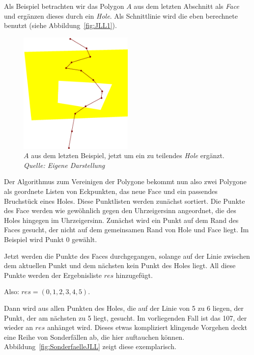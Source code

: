 Als Beispiel betrachten wir das Polygon $A$ aus dem letzten Abschnitt als \textit{Face} und ergänzen dieses durch ein \textit{Hole}. Als Schnittlinie wird die eben berechnete benutzt (siehe Abbildung~\vref{fig:JLL1}).

\begin{figure}
	\centering
	\includegraphics[width=0.5\textwidth]{JLL1.svg.eps}
	\caption[Face mit einem Hole wird geteilt]{$A$ aus dem letzten Beispiel, jetzt um ein zu teilendes \textit{Hole} ergänzt.\\\textit{Quelle: Eigene Darstellung}}
	\label{fig:JLL1}
\end{figure}

Der Algorithmus zum Vereinigen der Polygone bekommt nun also zwei Polygone als geordnete Listen von Eckpunkten, das neue Face und ein passendes Bruchstück eines Holes. Diese Punktlisten werden zunächst sortiert. Die Punkte des Face werden wie gewöhnlich gegen den Uhrzeigersinn  angeordnet, die des Holes hingegen im Uhrzeigersinn. Zunächst wird  ein Punkt auf dem Rand des Faces gesucht, der nicht auf dem gemeinsamen Rand von Hole und Face liegt. Im Beispiel wird Punkt 0 gewählt.

Jetzt werden die Punkte des Faces durchgegangen, solange auf der Linie zwischen dem aktuellen Punkt und dem nächsten kein Punkt des Holes liegt. All diese Punkte werden der Ergebnisliste $res$ hinzugefügt.

Also: $res=(0, 1, 2, 3, 4, 5)$.

Dann wird aus allen Punkten des Holes, die auf der Linie von 5 zu 6 liegen, der Punkt, der am nächsten zu 5 liegt,  gesucht. Im vorliegenden Fall ist das 107, der wieder an $res$ anhänget wird. Dieses etwas kompliziert klingende Vorgehen deckt eine Reihe von Sonderfällen ab, die hier auftauchen können. Abbildung~\vref{fig:SonderfaelleJLL} zeigt diese exemplarisch.

